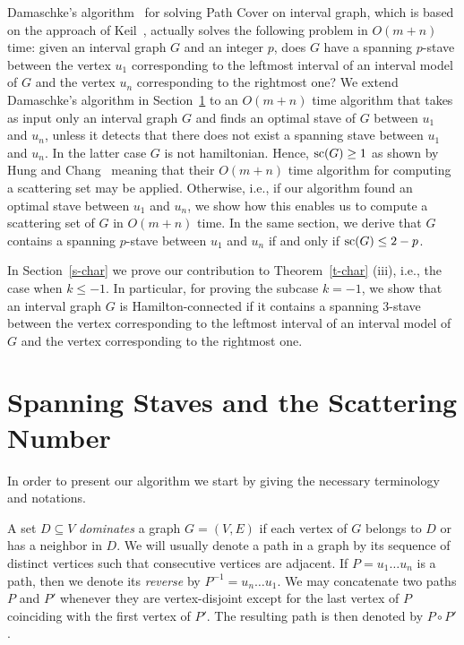 \documentclass{llncs}
\DeclareMathOperator{\scat}{{\rm sc}}
\begin{document}
Damaschke's algorithm~\cite{Da93}  for solving {\sc Path Cover} on interval graph, which is based on the approach of Keil~\cite{Ke85}, actually solves the following problem in $O(m+n)$ time: given an interval graph $G$ and an integer $p$, does $G$ have a spanning $p$-stave between the vertex $u_1$  corresponding to the leftmost interval of an interval model of $G$ and the vertex $u_n$ corresponding to the rightmost one?  We extend Damaschke's algorithm in Section~\ref{s-algo} to an $O(m+n)$ time algorithm that takes as input only an interval graph $G$ and finds an optimal stave of $G$ between $u_1$ and $u_n$, unless it detects that there does not exist a spanning stave between $u_1$ and $u_n$. 
In the latter case  $G$ is not hamiltonian. Hence,  $\scat(G)\geq 1$ as shown by Hung and Chang~\cite{HC11} meaning that their $O(m+n)$ time algorithm for computing a scattering set may be applied. 
Otherwise, i.e., if our algorithm found an optimal stave between $u_1$ and $u_n$, we show how this enables us to compute a scattering set of $G$ in $O(m+n)$ time. In the same section, we derive
that $G$ contains a spanning $p$-stave between $u_1$ and $u_n$ if and only if $\scat(G)\le 2-p$.

In Section~\ref{s-char} we prove our contribution to Theorem~\ref{t-char} (iii), i.e., the case when $k\leq -1$. In particular, for proving the subcase $k=-1$, we show that an interval graph $G$  is Hamilton-connected if it contains a spanning $3$-stave between 
the vertex  corresponding to the leftmost interval of an interval model of $G$ and the vertex corresponding to the rightmost one. 



\section{Spanning Staves and the Scattering Number}\label{s-algo}

In order to present our algorithm we start by giving the necessary terminology and notations.

A set $D\subseteq V$ \emph{dominates} a graph $G=(V,E)$ if each vertex of $G$ belongs to $D$ or has a neighbor in $D$. 
We will usually denote a path in a graph by its sequence of distinct vertices such that consecutive vertices are adjacent.
If $P=u_1\dots u_n$ is a path, then we denote its \emph{reverse} by $P^{-1}=u_n\dots u_1$.  
We may concatenate two paths $P$ and $P'$ whenever they are vertex-disjoint except for the last vertex of $P$ coinciding with the first vertex of $P'$.
The resulting path is then denoted by $P\circ P'$.
\end{document}
